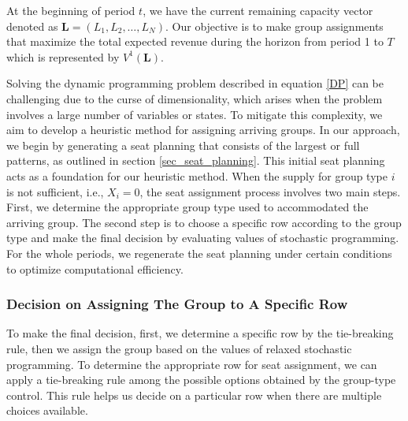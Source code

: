 At the beginning of period $t$, we have the current remaining capacity vector denoted as $\mathbf{L} = (L_1, L_2, \ldots, L_N)$. Our objective is to make group assignments that maximize the total expected revenue during the horizon from period 1 to $T$ which is represented by $V^{1}(\mathbf{L})$.

Solving the dynamic programming problem described in equation \eqref{DP} can be challenging due to the curse of dimensionality, which arises when the problem involves a large number of variables or states. To mitigate this complexity, we aim to develop a heuristic method for assigning arriving groups. In our approach, we begin by generating a seat planning that consists of the largest or full patterns, as outlined in section \ref{sec_seat_planning}. This initial seat planning acts as a foundation for our heuristic method. When the supply for group type $i$ is not sufficient, i.e., $X_i=0$, the seat assignment process involves two main steps. First, we determine the appropriate group type used to accommodated the arriving group. The second step is to choose a specific row according to the group type and make the final decision by evaluating values of stochastic programming. For the whole periods, we regenerate the seat planning under certain conditions to optimize computational efficiency.



\subsubsection{Decision on Assigning The Group to A Specific Row}
To make the final decision, first, we determine a specific row by the tie-breaking rule, then we assign the group based on the values of relaxed stochastic programming. To determine the appropriate row for seat assignment, we can apply a tie-breaking rule among the possible options obtained by the group-type control. This rule helps us decide on a particular row when there are multiple choices available. 

